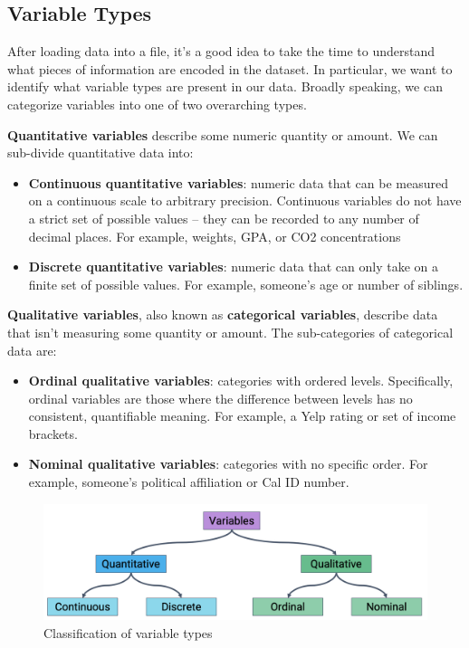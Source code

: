\documentclass[
  letterpaper,
  DIV=11,
  numbers=noendperiod]{scrreprt}
\providecommand{\tightlist}{%
  \setlength{\itemsep}{0pt}\setlength{\parskip}{0pt}}\usepackage{longtable,booktabs,array}
\begin{document}
\hypertarget{variable-types}{%
\subsection{Variable Types}\label{variable-types}}

After loading data into a file, it's a good idea to take the time to
understand what pieces of information are encoded in the dataset. In
particular, we want to identify what variable types are present in our
data. Broadly speaking, we can categorize variables into one of two
overarching types.

\textbf{Quantitative variables} describe some numeric quantity or
amount. We can sub-divide quantitative data into:

\begin{itemize}
\tightlist
\item
  \textbf{Continuous quantitative variables}: numeric data that can be
  measured on a continuous scale to arbitrary precision. Continuous
  variables do not have a strict set of possible values -- they can be
  recorded to any number of decimal places. For example, weights, GPA,
  or CO2 concentrations
\item
  \textbf{Discrete quantitative variables}: numeric data that can only
  take on a finite set of possible values. For example, someone's age or
  number of siblings.
\end{itemize}

\textbf{Qualitative variables}, also known as \textbf{categorical
variables}, describe data that isn't measuring some quantity or amount.
The sub-categories of categorical data are:

\begin{itemize}
\tightlist
\item
  \textbf{Ordinal qualitative variables}: categories with ordered
  levels. Specifically, ordinal variables are those where the difference
  between levels has no consistent, quantifiable meaning. For example, a
  Yelp rating or set of income brackets.
\item
  \textbf{Nominal qualitative variables}: categories with no specific
  order. For example, someone's political affiliation or Cal ID number.
\end{itemize}

\begin{figure}

{\centering \includegraphics{eda/images/variable.png}

}

\caption{Classification of variable types}

\end{figure}
\end{document}
